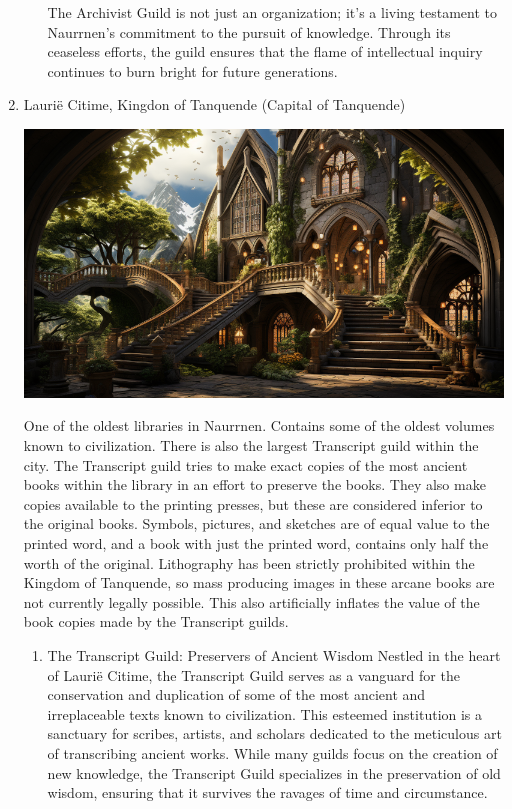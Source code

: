 \documentclass[11pt]{article}
\begin{document}
\begin{enumerate}
\begin{enumerate}
The Archivist Guild is not just an organization; it's a living testament to Naurrnen’s commitment to the pursuit of knowledge. Through its ceaseless efforts, the guild ensures that the flame of intellectual inquiry continues to burn bright for future generations.
\end{enumerate}
\item Laurië Citime, Kingdon of Tanquende (Capital of Tanquende)
\label{sec:org5791b20}
\begin{center}
\includegraphics[width=500px]{./img/Laurie_Citime.png}
\end{center}
One of the oldest libraries in Naurrnen. Contains some of the oldest volumes known to civilization. There is also the largest Transcript guild within the city. The Transcript guild tries to make exact copies of the most ancient books within the library in an effort to preserve the books. They also make copies available to the printing presses, but these are considered inferior to the original books. Symbols, pictures, and sketches are of equal value to the printed word, and a book with just the printed word, contains only half the worth of the original. Lithography has been strictly prohibited within the Kingdom of Tanquende, so mass producing images in these arcane books are not currently legally possible. This also artificially inflates the value of the book copies made by the Transcript guilds.
\begin{enumerate}
\item The Transcript Guild: Preservers of Ancient Wisdom
\label{sec:org131df98}
Nestled in the heart of Laurië Citime, the Transcript Guild serves as a vanguard for the conservation and duplication of some of the most ancient and irreplaceable texts known to civilization. This esteemed institution is a sanctuary for scribes, artists, and scholars dedicated to the meticulous art of transcribing ancient works. While many guilds focus on the creation of new knowledge, the Transcript Guild specializes in the preservation of old wisdom, ensuring that it survives the ravages of time and circumstance.


\end{enumerate}
\end{enumerate}
\end{document}
